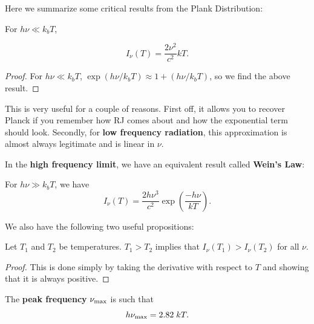 Here we summarize some critical results from the Plank Distribution:
\vspace{0.25cm}
\begin{definition}
For $h\nu \ll k_bT$, 

\begin{equation}
\label{eq:Rayleigh-Jeans}
\boxed{
I_\nu(T) =  \frac{2\nu^2}{c^2} kT.
}
\end{equation}
\end{definition}
\begin{proof}
    For $h\nu \ll k_bT$, $\exp(h\nu/k_bT) \approx 1+ (h\nu/k_bT)$, so we find the above result.
\end{proof}
\begin{remark}
    This is very useful for a couple of reasons. First off, it allows you to recover Planck if you remember how RJ comes about and how the exponential term should look. Secondly, for \textbf{low frequency radiation}, this approximation is almost always legitimate and is linear in $\nu$.
\end{remark}
\vspace{0.25cm}
In the \textbf{high frequency limit}, we have an equivalent result called \textbf{Wein's Law}:
\vspace{0.25cm}
\begin{definition}
    For $h\nu \gg k_bT$, we have
    \begin{equation}
        \label{eq:Wein-Law}
            I_\nu(T) = \frac{2h \nu^3}{c^2} \exp\left(\frac{-h\nu}{kT}\right).
    \end{equation}
\end{definition}
\vspace{0.25cm}
We also have the following two useful propositions:
\vspace{0.1cm}
\begin{proposition}[Monotonicity]
Let $T_1$ and $T_2$ be temperatures. $T_1 > T_2$ implies that $I_\nu(T_1) > I_\nu(T_2)$ for all $\nu$.
\end{proposition}
\begin{proof}
    This is done simply by taking the derivative with respect to $T$ and showing that it is always positive.
\end{proof}

\begin{proposition}
The \textbf{peak frequency} $\nu_{\rm max}$ is such that
\[
h\nu_{\rm max} = 2.82\; kT.
\]
\end{proposition}

